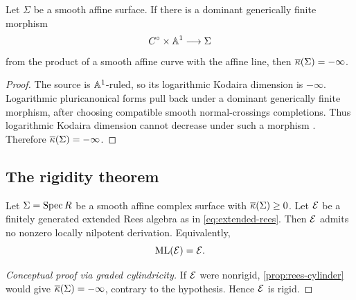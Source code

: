 \begin{lemma}\label{lem:log-obstruction}
Let $\Sigma$ be a smooth affine surface.  If there is a dominant generically finite morphism
\[
  C^{\circ}\times\mathbb A^1\longrightarrow\Sigma
\]
from the product of a smooth affine curve with the affine line, then $\overline\kappa(\Sigma)=-\infty$.
\end{lemma}

\begin{proof}
The source is $\mathbb A^1$-ruled, so its logarithmic Kodaira dimension is $-\infty$.  Logarithmic pluricanonical forms pull back under a dominant generically finite morphism, after choosing compatible smooth normal-crossings completions.  Thus logarithmic Kodaira dimension cannot decrease under such a morphism \cite{Iitaka1977}.  Therefore $\overline\kappa(\Sigma)=-\infty$.
\end{proof}

\subsection{The rigidity theorem}

\begin{theorem}\label{thm:rees-rigidity}
Let $\Sigma=\operatorname{Spec} R$ be a smooth affine complex surface with $\overline\kappa(\Sigma)\geq0$.  Let $\mathcal E$ be a finitely generated extended Rees algebra as in \eqref{eq:extended-rees}.  Then $\mathcal E$ admits no nonzero locally nilpotent derivation.  Equivalently,
\[
  \operatorname{ML}(\mathcal E)=\mathcal E.
\]
\end{theorem}

\begin{proof}[Conceptual proof via graded cylindricity]
If $\mathcal E$ were nonrigid, \cref{prop:rees-cylinder} would give $\overline\kappa(\Sigma)=-\infty$, contrary to the hypothesis.  Hence $\mathcal E$ is rigid.
\end{proof}

